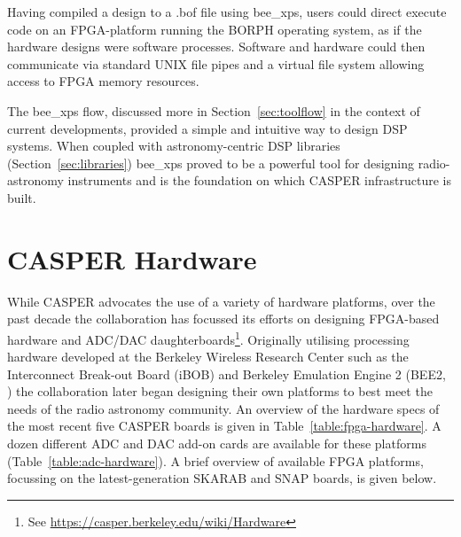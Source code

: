 \documentclass{ws-jai}
\begin{document}
Having compiled a design to a .bof file using bee\_xps, users could direct execute code on an FPGA-platform running the BORPH operating system, as if the hardware designs were software processes. Software and hardware could then communicate via standard UNIX file pipes and a virtual file system allowing access to FPGA memory resources.

The bee\_xps flow, discussed more in Section~\ref{sec:toolflow} in the context of current developments, provided a simple and intuitive way to design DSP systems. When coupled with astronomy-centric DSP libraries (Section~\ref{sec:libraries}) bee\_xps proved to be a powerful tool for designing radio-astronomy instruments and is the foundation on which CASPER infrastructure is built.

\section{CASPER Hardware} \label{sec:Hardware}

While CASPER advocates the use of a variety of hardware platforms, over the past decade the collaboration has focussed its efforts on designing FPGA-based hardware and ADC/DAC daughterboards\footnote{See \url{https://casper.berkeley.edu/wiki/Hardware}}. Originally utilising processing hardware developed at the Berkeley Wireless Research Center such as the Interconnect Break-out Board (iBOB) and Berkeley Emulation Engine 2 (BEE2, \citet{bee2}) the collaboration later began designing their own platforms to best meet the needs of the radio astronomy community. An overview of the hardware specs of the most recent five CASPER boards is given in Table~\ref{table:fpga-hardware}. A dozen different ADC and DAC add-on cards are available for these platforms (Table~\ref{table:adc-hardware}). A brief overview of available FPGA platforms, focussing on the latest-generation SKARAB and SNAP boards, is given below.
\end{document}
